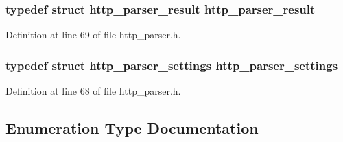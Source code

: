 \subsubsection[{http\+\_\+parser\+\_\+result}]{\setlength{\rightskip}{0pt plus 5cm}typedef struct {\bf http\+\_\+parser\+\_\+result} {\bf http\+\_\+parser\+\_\+result}}\label{http__parser_8h_ab8f441a408aa8739f5641fbba4281d3b}


Definition at line 69 of file http\+\_\+parser.\+h.

\subsubsection[{http\+\_\+parser\+\_\+settings}]{\setlength{\rightskip}{0pt plus 5cm}typedef struct {\bf http\+\_\+parser\+\_\+settings} {\bf http\+\_\+parser\+\_\+settings}}\label{http__parser_8h_ac5e078ef0f2f2bfa5d132469a58a5674}


Definition at line 68 of file http\+\_\+parser.\+h.



\subsection{Enumeration Type Documentation}
